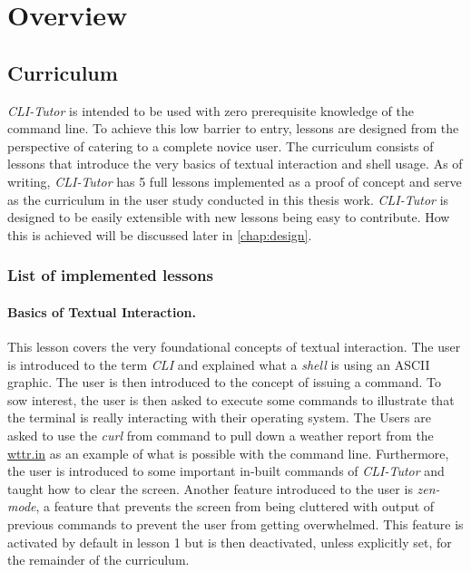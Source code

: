 \section{Overview}
\subsection{Curriculum}

\textit{CLI-Tutor} is intended to be used with zero prerequisite knowledge of
the command line. To achieve this low barrier to entry, lessons are designed
from the perspective of catering to a complete novice user. The curriculum
consists of lessons that introduce the very basics of textual interaction and
shell usage. As of writing, \textit{CLI-Tutor} has 5 full lessons implemented
as a proof of concept and serve as the curriculum in the user study conducted
in this thesis work. \textit{CLI-Tutor} is designed to be easily extensible
with new lessons being easy to contribute. How this is achieved will be
discussed later in \autoref{chap:design}.

\subsubsection{List of implemented lessons}

\paragraph{Basics of Textual Interaction.} This lesson covers the very
foundational concepts of textual interaction. The user is introduced to the
term \textit{CLI} and explained what a \textit{shell} is using an ASCII
graphic. The user is then introduced to the concept of issuing a command. To
sow interest, the user is then asked to execute some commands to illustrate that
the terminal is really interacting with their operating system. The Users are
asked to use the \textit{curl} from command to pull down a weather report from
the \url{wttr.in} as an example of what is possible with the command line.
Furthermore, the user is introduced to some important in-built commands
of \textit{CLI-Tutor} and taught how to clear the screen. Another feature
introduced to the user is \textit{zen-mode}, a feature that prevents the screen
from being cluttered with output of previous commands to prevent the user from
getting overwhelmed. This feature is activated by default in lesson 1 but is
then deactivated, unless explicitly set, for the remainder of the curriculum.

